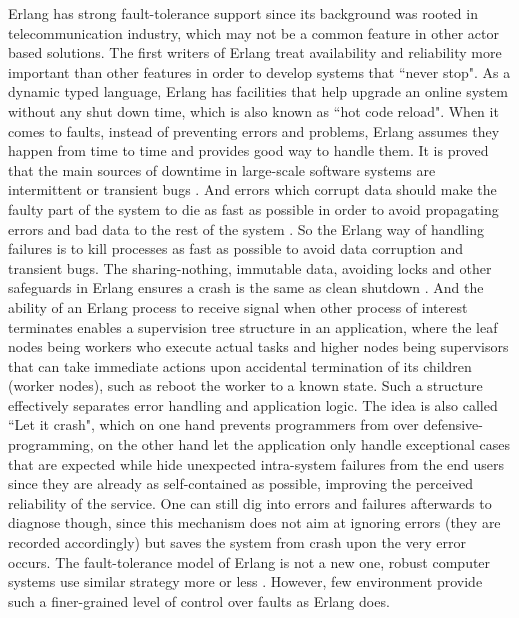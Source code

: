 Erlang has strong fault-tolerance support since its background was rooted in telecommunication industry, which may not be a common feature in other actor based solutions. The first writers of Erlang treat availability and reliability more important than other features in order to develop systems that ``never stop". As a dynamic typed language, Erlang has facilities that help upgrade an online system without any shut down time, which is also known as ``hot code reload". When it comes to faults, instead of preventing errors and problems, Erlang assumes they happen from time to time and provides good way to handle them. It is proved that the main sources of downtime in large-scale software systems are intermittent or transient bugs \cite{candea2003crash}. And errors which corrupt data should make the faulty part of the system to die as fast as possible in order to avoid propagating errors and bad data to the rest of the system \cite{learn_you_some_erlang}. So the Erlang way of handling failures is to kill processes as fast as possible to avoid data corruption and transient bugs. The sharing-nothing, immutable data, avoiding locks and other safeguards in Erlang ensures a crash is the same as clean shutdown \cite{learn_you_some_erlang}. And the ability of an Erlang process to receive signal when other process of interest terminates enables a supervision tree structure in an application, where the leaf nodes being workers who execute actual tasks and higher nodes being supervisors that can take immediate actions upon accidental termination of its children (worker nodes), such as reboot the worker to a known state. Such a structure effectively separates error handling and application logic. The idea is also called ``Let it crash",  which on one hand prevents programmers from over defensive-programming, on the other hand let the application only handle exceptional cases that are expected while hide unexpected intra-system failures from the end users since they are already as self-contained as possible, improving the perceived reliability of the service. One can still dig into errors and failures afterwards to diagnose though, since this mechanism does not aim at ignoring errors (they are recorded accordingly) but saves the system from crash upon the very error occurs. The fault-tolerance model of Erlang is not a new one, robust computer systems use similar strategy more or less \cite{gray1986computers}. However, few environment provide such a finer-grained level of control over faults as Erlang does.

